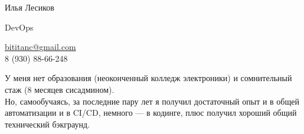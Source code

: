 \documentclass[11pt, a4paper]{article}
\begin{document}
\begin{spacing}{0.3}
{\LARGE Илья Лесиков}\\
\end{spacing}


{\setlength\multicolsep{0pt}%
\begin{multicols}{2}





\begin{spacing}{0.7}
  {\large DevOps}\hspace{1.55cm}{25 лет}\\
\end{spacing}

\columnbreak

\begin{flushright}
    \href{mailto:bititanc@gmail.com}{bititanc@gmail.com}\\
    8 (930) 88-66-248\\
\end{flushright}

\end{multicols}
}

\vspace{30pt}

У меня нет образования (неоконченный колледж электроники) и сомнительный стаж (8 месяцев сисадмином).\\
Но, самообучаясь, за последние пару лет я получил достаточный опыт и в общей автоматизации и в CI/CD, немного — в кодинге, плюс получил хороший общий технический бэкграунд.
\end{document}
